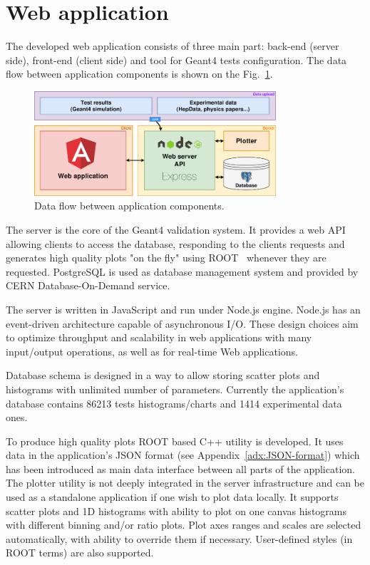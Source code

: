 \section{Web application}
\label{sec-webapplication}

The developed web application consists of three main part: back-end (server side), front-end (client side) and tool 
for Geant4 tests configuration. The data flow between application components is shown on the Fig.~\ref{fig:dataflow}.

\begin{figure}[h]
    \centering
    \includegraphics[width=0.8\textwidth,clip]{schema.png}
    \caption{Data flow between application components.}
    \label{fig:dataflow}
\end{figure}

The server is the core of the Geant4 validation system. It provides a web API allowing clients to access the database, responding to the clients requests and generates high quality plots "on the fly" using ROOT~\cite{ROOT} whenever they are requested. PostgreSQL is used as database management system and provided by CERN Database-On-Demand service.

The server is written in JavaScript and run under Node.js engine. Node.js has an event-driven architecture capable of asynchronous I/O. These design choices aim to optimize throughput and scalability in web applications with many input/output operations, as well as for real-time Web applications.

Database schema is designed in a way to allow storing scatter plots and histograms with unlimited number of parameters. Currently the application's database contains 86213 tests histograms/charts and 1414 experimental data ones.

To produce high quality plots ROOT based C++ utility is developed. It uses data in the application's JSON format (see Appendix~\ref{adx:JSON-format}) which has been introduced as main data interface between all parts of the application. The plotter utility is not deeply integrated in the server infrastructure and can be used as a standalone application if one wish to plot data locally. It supports scatter plots and 1D histograms with ability to plot on one canvas histograms with different binning and/or ratio plots. Plot axes ranges and scales are selected automatically, with ability to override them if necessary. User-defined styles (in ROOT terms) are also supported.

